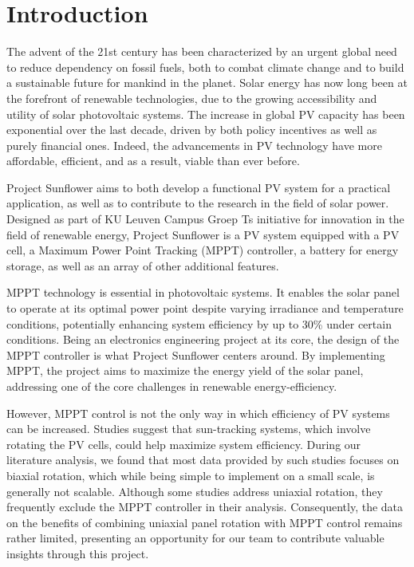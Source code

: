 \chapter{Introduction}
The advent of the 21st century has been characterized by an urgent global need to reduce dependency on fossil fuels, both to combat climate change and to build a sustainable future for mankind in the planet. Solar energy has now long been at the forefront of renewable technologies, due to the growing accessibility and utility of solar photovoltaic systems. The increase in global PV capacity has been exponential over the last decade, driven by both policy incentives as well as purely financial ones. Indeed, the advancements in PV technology have more affordable, efficient, and as a result, viable than ever before.\cite{irena2020}

Project Sunflower aims to both develop a functional PV system for a practical application, as well as to contribute to the research in the field of solar power. Designed as part of KU Leuven Campus Groep T\textquotesingle s initiative for innovation in the field of renewable energy, Project Sunflower is a PV system equipped with a PV cell, a Maximum Power Point Tracking (MPPT) controller, a battery for energy storage, as well as an array of other additional features.

MPPT technology is essential in photovoltaic systems. It enables the solar panel to operate at its optimal power point despite varying irradiance and temperature conditions, potentially enhancing system efficiency by up to 30\% under certain conditions. \cite{4207429} Being an electronics engineering project at its core, the design of the MPPT controller is what Project Sunflower centers around. By implementing MPPT, the project aims to maximize the energy yield of the solar panel, addressing one of the core challenges in renewable energy-efficiency.

However, MPPT control is not the only way in which efficiency of PV systems can be increased. Studies suggest that sun-tracking systems, which involve rotating the PV cells, could help maximize system efficiency. \cite{KOUSSA20111756} During our literature analysis, we found that most data provided by such studies focuses on biaxial rotation, which while being simple to implement on a small scale, is generally not scalable. Although some studies address uniaxial rotation, they frequently exclude the MPPT controller in their analysis. Consequently, the data on the benefits of combining uniaxial panel rotation with MPPT control remains rather limited, presenting an opportunity
for our team to contribute valuable insights through this project.


